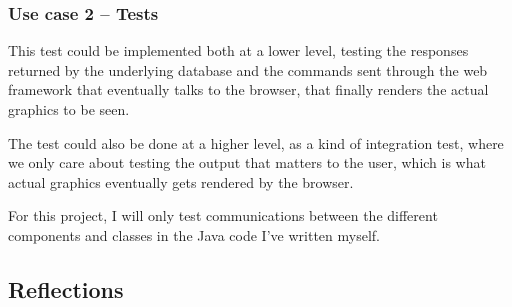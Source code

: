 \subsubsection{Use case 2 -- Tests}
This test could be implemented both at a lower level, testing the responses
returned by the underlying database and the commands sent through the 
web framework that eventually talks to the browser, that finally renders the
actual graphics to be seen.

The test could also be done at a higher level, as a kind of integration test,
where we only care about testing the output that matters to the user, which is
what actual graphics eventually gets rendered by the browser.

For this project, I will only test communications between the different 
components and classes in the Java code I've written myself.


\subsection{Reflections}\label{task-2-reflect}


